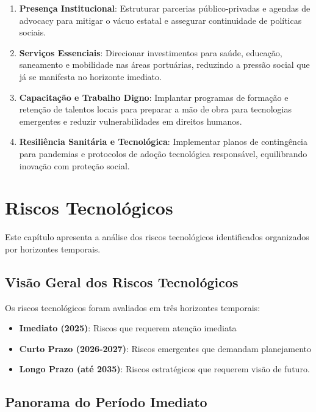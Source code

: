 \documentclass[
  portuguese,
  letterpaper,
  DIV=11,
  numbers=noendperiod]{scrreprt}
\providecommand{\tightlist}{%
  \setlength{\itemsep}{0pt}\setlength{\parskip}{0pt}}
\begin{document}
\begin{enumerate}
\def\labelenumi{\arabic{enumi}.}
\tightlist
\item
  \textbf{Presença Institucional}: Estruturar parcerias público-privadas
  e agendas de advocacy para mitigar o vácuo estatal e assegurar
  continuidade de políticas sociais.
\item
  \textbf{Serviços Essenciais}: Direcionar investimentos para saúde,
  educação, saneamento e mobilidade nas áreas portuárias, reduzindo a
  pressão social que já se manifesta no horizonte imediato.
\item
  \textbf{Capacitação e Trabalho Digno}: Implantar programas de formação
  e retenção de talentos locais para preparar a mão de obra para
  tecnologias emergentes e reduzir vulnerabilidades em direitos humanos.
\item
  \textbf{Resiliência Sanitária e Tecnológica}: Implementar planos de
  contingência para pandemias e protocolos de adoção tecnológica
  responsável, equilibrando inovação com proteção social.
\end{enumerate}


\chapter{Riscos Tecnológicos}\label{riscos-tecnoluxf3gicos-1}

Este capítulo apresenta a análise dos riscos tecnológicos identificados
organizados por horizontes temporais.

\section{Visão Geral dos Riscos
Tecnológicos}\label{visuxe3o-geral-dos-riscos-tecnoluxf3gicos}

Os riscos tecnológicos foram avaliados em três horizontes temporais:

\begin{itemize}
\tightlist
\item
  \textbf{Imediato (2025)}: Riscos que requerem atenção imediata
\item
  \textbf{Curto Prazo (2026-2027)}: Riscos emergentes que demandam
  planejamento
\item
  \textbf{Longo Prazo (até 2035)}: Riscos estratégicos que requerem
  visão de futuro.
\end{itemize}

\section{Panorama do Período
Imediato}\label{panorama-do-peruxedodo-imediato-3}
\end{document}
